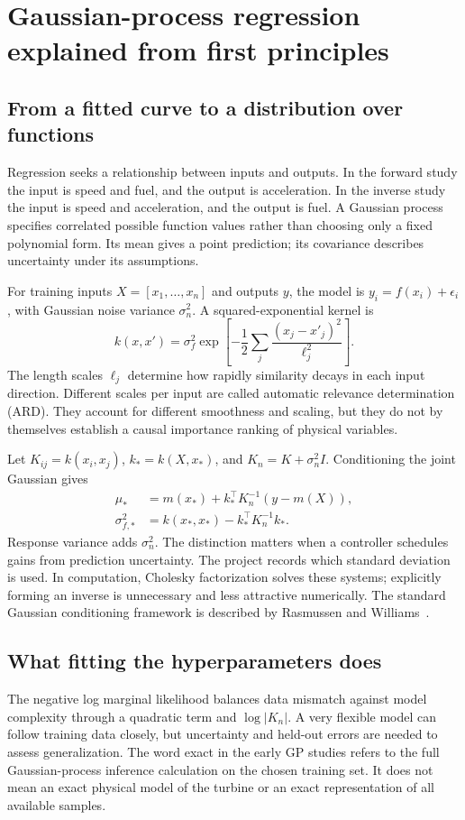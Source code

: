 \chapter{Gaussian-process regression explained from first principles}
\section{From a fitted curve to a distribution over functions}
Regression seeks a relationship between inputs and outputs. In the forward study the input is speed and fuel, and the output is acceleration. In the inverse study the input is speed and acceleration, and the output is fuel. A Gaussian process specifies correlated possible function values rather than choosing only a fixed polynomial form. Its mean gives a point prediction; its covariance describes uncertainty under its assumptions.

For training inputs $X=[x_1,\ldots,x_n]$ and outputs $y$, the model is $y_i=f(x_i)+\epsilon_i$, with Gaussian noise variance $\sigma_n^2$. A squared-exponential kernel is
\begin{equation}k(x,x')=\sigma_f^2\exp\left[-\frac12\sum_j\frac{(x_j-x'_j)^2}{\ell_j^2}\right].
\end{equation}
The length scales $\ell_j$ determine how rapidly similarity decays in each input direction. Different scales per input are called automatic relevance determination (ARD). They account for different smoothness and scaling, but they do not by themselves establish a causal importance ranking of physical variables.

Let $K_{ij}=k(x_i,x_j)$, $k_*=k(X,x_*)$, and $K_n=K+\sigma_n^2I$. Conditioning the joint Gaussian gives
\begin{align}\mu_*&=m(x_*)+k_*^\top K_n^{-1}(y-m(X)),\\
\sigma_{f,*}^2&=k(x_*,x_*)-k_*^\top K_n^{-1}k_*.
\end{align}
Response variance adds $\sigma_n^2$. The distinction matters when a controller schedules gains from prediction uncertainty. The project records which standard deviation is used. In computation, Cholesky factorization solves these systems; explicitly forming an inverse is unnecessary and less attractive numerically. The standard Gaussian conditioning framework is described by Rasmussen and Williams~\cite{gpml}.

\section{What fitting the hyperparameters does}
The negative log marginal likelihood balances data mismatch against model complexity through a quadratic term and $\log|K_n|$. A very flexible model can follow training data closely, but uncertainty and held-out errors are needed to assess generalization. The word exact in the early GP studies refers to the full Gaussian-process inference calculation on the chosen training set. It does not mean an exact physical model of the turbine or an exact representation of all available samples.

